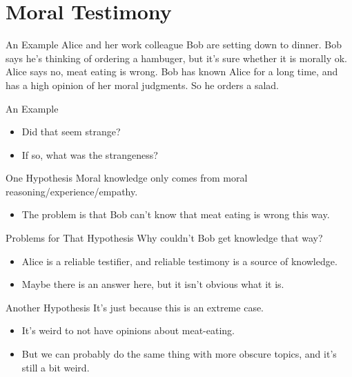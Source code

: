 \documentclass[
  17pt,
  letterpaper,
  ignorenonframetext,
  aspectratio=169,
  handout]{beamer}
\providecommand{\tightlist}{%
  \setlength{\itemsep}{0pt}\setlength{\parskip}{0pt}}\usepackage{longtable,booktabs,array}
\begin{document}
\hypertarget{moral-testimony}{%
\section{Moral Testimony}\label{moral-testimony}}

\begin{frame}{An Example}
\protect\hypertarget{an-example}{}
Alice and her work colleague Bob are setting down to dinner. Bob says
he's thinking of ordering a hambuger, but it's sure whether it is
morally ok. Alice says no, meat eating is wrong. Bob has known Alice for
a long time, and has a high opinion of her moral judgments. So he orders
a salad.
\end{frame}

\begin{frame}{An Example}
\protect\hypertarget{an-example-1}{}
\begin{itemize}[<+->]
\tightlist
\item
  Did that seem strange?
\item
  If so, what was the strangeness?
\end{itemize}
\end{frame}

\begin{frame}{One Hypothesis}
\protect\hypertarget{one-hypothesis}{}
Moral knowledge only comes from moral reasoning/experience/empathy.

\begin{itemize}[<+->]
\tightlist
\item
  The problem is that Bob can't know that meat eating is wrong this way.
\end{itemize}
\end{frame}

\begin{frame}{Problems for That Hypothesis}
\protect\hypertarget{problems-for-that-hypothesis}{}
Why couldn't Bob get knowledge that way?

\begin{itemize}[<+->]
\tightlist
\item
  Alice is a reliable testifier, and reliable testimony is a source of
  knowledge.
\item
  Maybe there is an answer here, but it isn't obvious what it is.
\end{itemize}
\end{frame}

\begin{frame}{Another Hypothesis}
\protect\hypertarget{another-hypothesis}{}
It's just because this is an extreme case.

\begin{itemize}[<+->]
\tightlist
\item
  It's weird to not have opinions about meat-eating.
\item
  But we can probably do the same thing with more obscure topics, and
  it's still a bit weird.
\end{itemize}
\end{frame}
\end{document}
